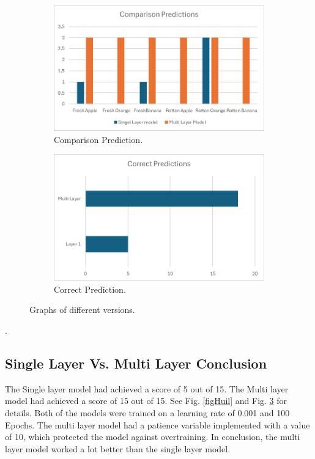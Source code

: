\documentclass[conference]{IEEEtran}
\begin{document}
\begin{figure}[h]
    \centering
    \begin{subfigure}[b]{0.48\linewidth}
        \centering
        \includegraphics[width=\linewidth]{Graft1.png}
        \caption{Comparison Prediction.}
        \label{figFA}
    \end{subfigure}
    \hfill
    \begin{subfigure}[b]{0.48\linewidth}
        \centering
        \includegraphics[width=\linewidth]{Graft2.png}
        \caption{Correct Prediction.}
        \label{figFB}
    \end{subfigure}
    \caption{Graphs of different versions.}
    \label{FigGraph}
\end{figure}.

\subsection{Single Layer Vs. Multi Layer Conclusion}

The Single layer model had achieved a score of 5 out of 15. The Multi layer model had achieved a score of 15 out of 15. See Fig. \ref{figHuil} and Fig. \ref{FigGraph} for details. Both of the models were trained on a learning rate of 0.001 and 100 Epochs. The multi layer model had a patience variable implemented with a value of 10, which protected the model against overtraining. In conclusion, the multi layer model worked a lot better than the single layer model.
\end{document}
